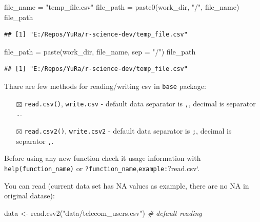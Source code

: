 \documentclass[
]{book}
\newenvironment{Shaded}{\begin{snugshade}}{\end{snugshade}}
\newcommand{\AttributeTok}[1]{\textcolor[rgb]{0.77,0.63,0.00}{#1}}
\newcommand{\CommentTok}[1]{\textcolor[rgb]{0.56,0.35,0.01}{\textit{#1}}}
\newcommand{\FunctionTok}[1]{\textcolor[rgb]{0.00,0.00,0.00}{#1}}
\newcommand{\NormalTok}[1]{#1}
\newcommand{\OtherTok}[1]{\textcolor[rgb]{0.56,0.35,0.01}{#1}}
\newcommand{\StringTok}[1]{\textcolor[rgb]{0.31,0.60,0.02}{#1}}
\providecommand{\tightlist}{%
  \setlength{\itemsep}{0pt}\setlength{\parskip}{0pt}}
\begin{document}
\begin{Shaded}
\begin{Highlighting}[]
\NormalTok{file\_name }\OtherTok{=} \StringTok{"temp\_file.csv"}
\NormalTok{file\_path }\OtherTok{=} \FunctionTok{paste0}\NormalTok{(work\_dir, }\StringTok{"/"}\NormalTok{, file\_name)}
\NormalTok{file\_path}
\end{Highlighting}
\end{Shaded}

\begin{verbatim}
## [1] "E:/Repos/YuRa/r-science-dev/temp_file.csv"
\end{verbatim}

\begin{Shaded}
\begin{Highlighting}[]
\NormalTok{file\_path }\OtherTok{=} \FunctionTok{paste}\NormalTok{(work\_dir, file\_name, }\AttributeTok{sep =} \StringTok{"/"}\NormalTok{)}
\NormalTok{file\_path}
\end{Highlighting}
\end{Shaded}

\begin{verbatim}
## [1] "E:/Repos/YuRa/r-science-dev/temp_file.csv"
\end{verbatim}

Thare are few methods for reading/writing csv in \texttt{base} package:

\begin{itemize}
\tightlist
\item[$\boxtimes$]
  \texttt{read.csv()}, \texttt{write.csv} - default data separator is \texttt{,}, decimal is separator \texttt{.}.
\item[$\boxtimes$]
  \texttt{read.csv2()}, \texttt{write.csv2} - default data separator is \texttt{;}, decimal is separator \texttt{,}.
\end{itemize}

Before using any new function check it usage information with \texttt{help(function\_name)} or \texttt{?function\_name},\texttt{example:}?read.csv`.

You can read (current data set has NA values as example, there are no NA in original datase):

\begin{Shaded}
\begin{Highlighting}[]
\NormalTok{data }\OtherTok{\textless{}{-}} \FunctionTok{read.csv2}\NormalTok{(}\StringTok{"data/telecom\_users.csv"}\NormalTok{) }\CommentTok{\# default reading}
\end{Highlighting}
\end{Shaded}
\end{document}
